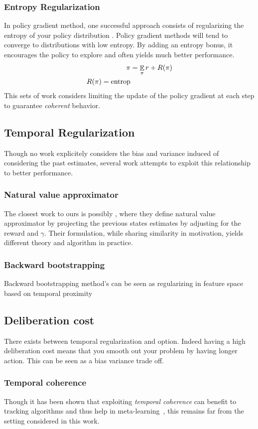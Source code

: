 \subsubsection{Entropy Regularization}
In policy gradient method, one successful approach consists of regularizing the entropy of your policy distribution \cite{neu2017unified}. Policy gradient methods will tend to converge to distributions with low entropy. By adding an entropy bonus, it encourages the policy to explore and often yields much better performance.
\begin{equation}
\begin{split}
    \pi &= \mathop{\mathbb{E}}_{\pi}{r} + R(\pi)\\
    R(\pi) = \text{entrop}
\end{split}
\end{equation}
This sets of work \cite{schulman2017proximal,schulman2015trust} considers limiting the update of the policy gradient at each step to guarantee \emph{coherent} behavior. 


\subsection{Temporal Regularization}
Though no work explicitely considers the bias and variance induced of considering the past estimates, several work attempts to exploit this relationship to better performance.
\subsubsection{Natural value approximator}
The closest work to ours is possibly \cite{xu2017natural}, where they define natural value approximator by projecting the previous states estimates by adjusting for the reward and $\gamma$. Their formulation, while sharing similarity in motivation, yields different theory and algorithm in practice.
\subsubsection{Backward bootstrapping}
Backward bootstrapping method's can be seen as regularizing in feature space based on temporal proximity \cite{sutton2009fast,li2008worst,baird1995residual}
\subsection{Deliberation cost}
There exists between temporal regularization and option. Indeed having a high deliberation cost \cite{harb2017waiting} means that you smooth out your problem by having longer action. This can be seen as a bias variance trade off. 
\subsubsection{Temporal coherence}
Though it has been shown that exploiting \emph{temporal coherence} can benefit to tracking algorithms and thus help in meta-learning~\cite{sutton2007role}, this remains far from the setting considered in this work.


